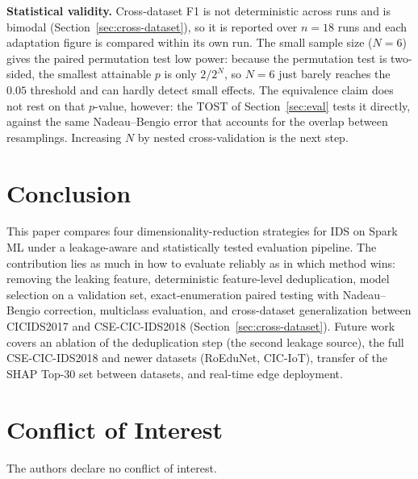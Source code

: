 \documentclass[11pt,conference,a4paper]{IEEEtran}
\begin{document}
\textbf{Statistical validity.} Cross-dataset F1 is not deterministic across runs and is bimodal (Section~\ref{sec:cross-dataset}), so it is reported over $n{=}18$ runs and each adaptation figure is compared within its own run. The small sample size ($N{=}6$) gives the paired permutation test low power: because the permutation test is two-sided, the smallest attainable $p$ is only $2/2^N$, so $N{=}6$ just barely reaches the $0.05$ threshold and can hardly detect small effects. The equivalence claim does not rest on that $p$-value, however: the TOST of Section~\ref{sec:eval} tests it directly, against the same Nadeau--Bengio error that accounts for the overlap between resamplings. Increasing $N$ by nested cross-validation is the next step.

\section{Conclusion}
\label{sec:conclude}

This paper compares four dimensionality-reduction strategies for IDS on Spark ML under a leakage-aware and statistically tested evaluation pipeline. The contribution lies as much in how to evaluate reliably as in which method wins: removing the leaking feature, deterministic feature-level deduplication, model selection on a validation set, exact-enumeration paired testing with Nadeau--Bengio correction, multiclass evaluation, and cross-dataset generalization between CICIDS2017 and CSE-CIC-IDS2018 (Section~\ref{sec:cross-dataset}). Future work covers an ablation of the deduplication step (the second leakage source), the full CSE-CIC-IDS2018 and newer datasets (RoEduNet, CIC-IoT), transfer of the SHAP Top-30 set between datasets, and real-time edge deployment.

\section*{Conflict of Interest}
The authors declare no conflict of interest.

{\footnotesize
\renewcommand{\IEEEbibitemsep}{0pt}

}
\end{document}
